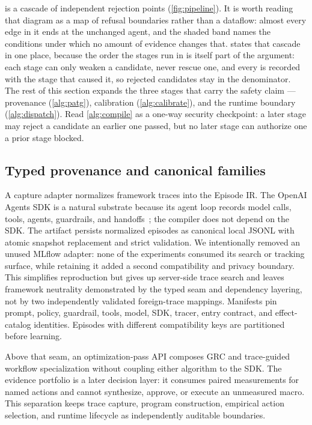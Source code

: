 \method is a cascade of independent rejection points (\cref{fig:pipeline}).  It is worth
reading that diagram as a map of refusal boundaries rather than a dataflow: almost every
edge in it ends at the unchanged agent, and the shaded band names the conditions under
which no amount of evidence changes that.
 states that cascade in one place, because the order the stages run in is
itself part of the argument: each stage can only weaken a candidate, never rescue one, and
every \retire is recorded with the stage that caused it, so rejected candidates stay in the
denominator.  The rest of this section expands the three stages that carry the safety
claim --- provenance (\cref{alg:patg}), calibration (\cref{alg:calibrate}), and the runtime
boundary (\cref{alg:dispatch}).  Read \cref{alg:compile} as a one-way security checkpoint:
a later stage may reject a candidate an earlier one passed, but no later stage can
authorize one a prior stage blocked.



\subsection{Typed provenance and canonical families}

A capture adapter normalizes framework traces into the Episode IR.  The OpenAI Agents SDK
is a natural substrate because its agent loop records model calls, tools, agents,
guardrails, and handoffs~\cite{openai2026agents}; the compiler does not depend on the SDK.
The artifact persists normalized episodes as canonical local JSONL with atomic snapshot
replacement and strict validation.  We intentionally removed an unused MLflow adapter:
none of the experiments consumed its search or tracking surface, while retaining it added
a second compatibility and privacy boundary.  This simplifies reproduction but gives up
server-side trace search and leaves framework neutrality demonstrated by the typed seam and
dependency layering, not by two independently validated foreign-trace mappings.
Manifests pin prompt, policy, guardrail, tools, model, SDK, tracer, entry contract, and
effect-catalog identities.  Episodes with different compatibility keys are partitioned
before learning.

Above that seam, an optimization-pass API composes GRC and trace-guided workflow
specialization without coupling either algorithm to the SDK.  The evidence portfolio is
a later decision layer: it consumes paired measurements for named actions and cannot
synthesize, approve, or execute an unmeasured macro.  This separation keeps trace capture,
program construction, empirical action selection, and runtime lifecycle as independently
auditable boundaries.

